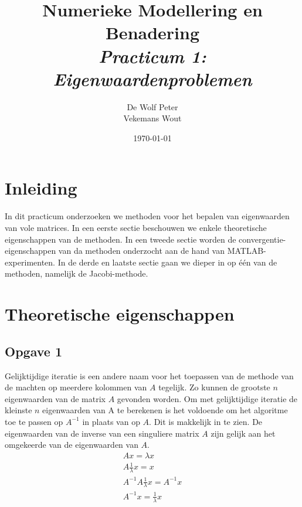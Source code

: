 \documentclass[a4paper, 12pt, titlepage]{report}
\begin{document}
\title{\textbf{Numerieke Modellering en Benadering}\\\textit{Practicum 1: Eigenwaardenproblemen}\\}
\author{De Wolf Peter\\ Vekemans Wout}

\date{\today}
\begin{titlepage}
	\maketitle
	\thispagestyle{empty}
\end{titlepage}

\newpage

\listoffigures

\newpage

\section{Inleiding}
In dit practicum onderzoeken we methoden voor het bepalen van eigenwaarden van vole matrices. In een eerste sectie beschouwen we enkele theoretische eigenschappen van de methoden. In een tweede sectie worden de convergentie-eigenschappen van da methoden onderzocht aan de hand van MATLAB-experimenten. In de derde en laatste sectie gaan we dieper in op \'e\'en van de methoden, namelijk de Jacobi-methode.
\section{Theoretische eigenschappen}


\subsection{Opgave 1}
Gelijktijdige iteratie is een andere naam voor het toepassen van de methode van de machten op meerdere kolommen van $A$ tegelijk. Zo kunnen de grootste $n$ eigenwaarden van de matrix $A$ gevonden worden.  Om met gelijktijdige iteratie de kleinste $n$ eigenwaarden van A te berekenen is het voldoende om het algoritme toe te passen op $A^{-1}$ in plaats van op $A$. Dit is makkelijk in te zien. De eigenwaarden van de inverse van een singuliere matrix $A$ zijn gelijk aan het omgekeerde van de eigenwaarden van $A$.\\
\begin{subequations} \label{eq:simIt}
\begin{align}
 Ax  = \lambda x \\
A\frac{1}{\lambda}x =  x\\
A^{-1}A\frac{1}{\lambda}x  =  A^{-1}x\\
A^{-1}x  =  \frac{1}{\lambda}x
\end{align}
\end{subequations}
\end{document}
